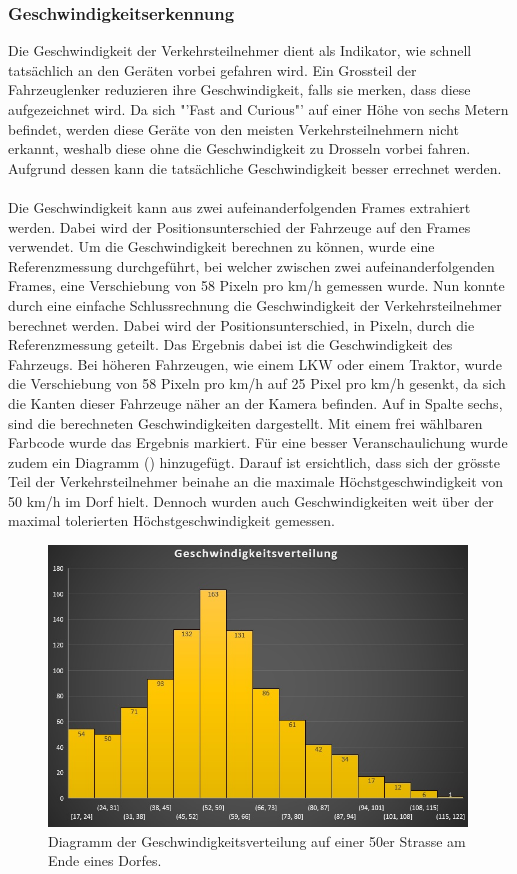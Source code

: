 \subsubsection{Geschwindigkeitserkennung}
Die Geschwindigkeit der Verkehrsteilnehmer dient als Indikator, wie schnell tatsächlich an den Geräten vorbei gefahren wird. Ein Grossteil der Fahrzeuglenker reduzieren ihre Geschwindigkeit, falls sie merken, dass diese aufgezeichnet wird. Da sich "'Fast and Curious"' auf einer Höhe von sechs Metern befindet, werden diese Geräte von den meisten Verkehrsteilnehmern nicht erkannt, weshalb diese ohne die Geschwindigkeit zu Drosseln vorbei fahren. Aufgrund dessen kann die tatsächliche Geschwindigkeit besser errechnet werden.\\\\
Die Geschwindigkeit kann aus zwei aufeinanderfolgenden Frames extrahiert werden. Dabei wird der Positionsunterschied der Fahrzeuge auf den Frames verwendet. Um die Geschwindigkeit berechnen zu können, wurde eine Referenzmessung durchgeführt, bei welcher zwischen zwei aufeinanderfolgenden Frames, eine Verschiebung von 58 Pixeln pro km/h gemessen wurde. Nun konnte durch eine einfache Schlussrechnung die Geschwindigkeit der Verkehrsteilnehmer berechnet werden. Dabei wird der Positionsunterschied, in Pixeln, durch die Referenzmessung geteilt. Das Ergebnis dabei ist die Geschwindigkeit des Fahrzeugs. Bei höheren Fahrzeugen, wie einem LKW oder einem Traktor, wurde die Verschiebung von 58 Pixeln pro km/h auf 25 Pixel pro km/h gesenkt, da sich die Kanten dieser Fahrzeuge näher an der Kamera befinden. Auf  in Spalte sechs, sind die berechneten Geschwindigkeiten dargestellt. Mit einem frei wählbaren Farbcode wurde das Ergebnis markiert. Für eine besser Veranschaulichung wurde zudem ein Diagramm () hinzugefügt. Darauf ist ersichtlich, dass sich der grösste Teil der Verkehrsteilnehmer beinahe an die maximale Höchstgeschwindigkeit von  50 km/h  im Dorf hielt. Dennoch wurden auch Geschwindigkeiten weit über der maximal tolerierten Höchstgeschwindigkeit gemessen.

\begin{figure}[H]
  \centering
  \includegraphics[width=0.99\textwidth]{Resultate/GeschwDiagramm.jpg} 
  \caption{Diagramm der Geschwindigkeitsverteilung auf einer 50er Strasse am Ende eines Dorfes.}
  \label{bGeschwDiagramm}
\end{figure}

